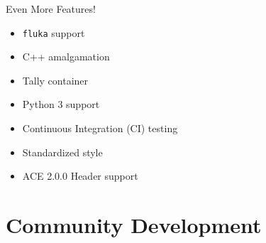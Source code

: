 \documentclass[xcolor=x11names,compress]{beamer}
\begin{document}
\begin{frame}{Even More Features!}
  \Large
    \begin{itemize}
        \item \texttt{fluka} support
        \item C++ amalgamation
        \item Tally container
        \item Python 3 support
        \item Continuous Integration (CI) testing
        \item Standardized style
        \item ACE 2.0.0 Header support
    \end{itemize}
\end{frame}




\section{Community Development}
\end{document}

